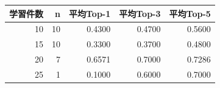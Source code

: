 \begin{tabular}{r r r r r}
\hline
学習件数 & n & 平均Top-1 & 平均Top-3 & 平均Top-5 \\
\hline
10 & 10 & 0.4300 & 0.4700 & 0.5600 \\
15 & 10 & 0.3300 & 0.3700 & 0.4800 \\
20 & 7 & 0.6571 & 0.7000 & 0.7286 \\
25 & 1 & 0.1000 & 0.6000 & 0.7000 \\
\hline
\end{tabular}
